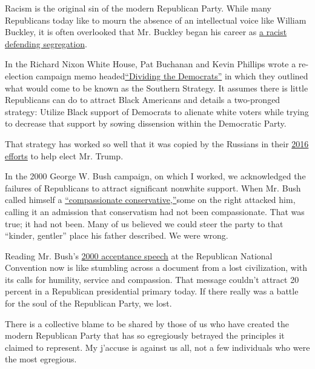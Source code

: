 Racism is the original sin of the modern Republican Party. While many
Republicans today like to mourn the absence of an intellectual voice
like William Buckley, it is often overlooked that Mr. Buckley began his
career as
\href{https://www.politico.com/magazine/story/2017/05/13/william-f-buckley-civil-rights-215129}{a
racist defending segregation}.

In the Richard Nixon White House, Pat Buchanan and Kevin Phillips wrote
a re-election campaign memo
headed\href{https://www.cnn.com/2010/POLITICS/01/11/nixon.racial.strategy/index.html}{``Dividing
the Democrats''} in which they outlined what would come to be known as
the Southern Strategy. It assumes there is little Republicans can do to
attract Black Americans and details a two-pronged strategy: Utilize
Black support of Democrats to alienate white voters while trying to
decrease that support by sowing dissension within the Democratic Party.

That strategy has worked so well that it was copied by the Russians in
their
\href{https://www.nytimes.com/2019/04/18/us/politics/the-mueller-report-excerpts.html}{2016
efforts} to help elect Mr. Trump.

In the 2000 George W. Bush campaign, on which I worked, we acknowledged
the failures of Republicans to attract significant nonwhite support.
When Mr. Bush called himself a
\href{https://www.nytimes.com/2000/06/12/us/bush-draws-campaign-theme-from-more-than-the-heart.html}{``compassionate
conservative,''}some on the right attacked him, calling it an admission
that conservatism had not been compassionate. That was true; it had not
been. Many of us believed we could steer the party to that ``kinder,
gentler'' place his father described. We were wrong.

Reading Mr. Bush's
\href{http://movies2.nytimes.com/library/politics/camp/080400wh-bush-speech.html}{2000
acceptance speech} at the Republican National Convention now is like
stumbling across a document from a lost civilization, with its calls for
humility, service and compassion. That message couldn't attract 20
percent in a Republican presidential primary today. If there really was
a battle for the soul of the Republican Party, we lost.

There is a collective blame to be shared by those of us who have created
the modern Republican Party that has so egregiously betrayed the
principles it claimed to represent. My j'accuse is against us all, not a
few individuals who were the most egregious.

